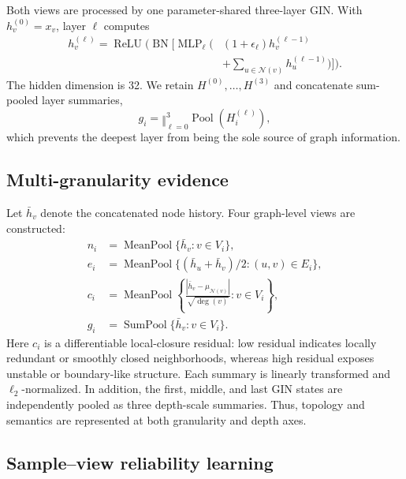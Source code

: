 \documentclass[10pt,twocolumn]{article}
\begin{document}
Both views are processed by one parameter-shared three-layer GIN. With $h_v^{(0)}=x_v$, layer $\ell$ computes
\begin{equation}
\label{eq:gin}
\begin{aligned}
h_v^{(\ell)}=\operatorname{ReLU}\!\Bigg(
\operatorname{BN}\!\Bigg[\operatorname{MLP}_{\ell}\!\Bigg(&
(1+\epsilon_{\ell})h_v^{(\ell-1)}\\[-2pt]
&+\sum_{u\in\mathcal N(v)}h_u^{(\ell-1)}\Bigg)\Bigg]\Bigg).
\end{aligned}
\end{equation}
The hidden dimension is 32. We retain $H^{(0)},\ldots,H^{(3)}$ and concatenate sum-pooled layer summaries,
\begin{equation}
g_i=\mathop{\Vert}_{\ell=0}^{3}\operatorname{Pool}\!\left(H_i^{(\ell)}\right),
\end{equation}
which prevents the deepest layer from being the sole source of graph information.

\subsection{Multi-granularity evidence}

Let $\bar h_v$ denote the concatenated node history. Four graph-level views are constructed:
\begin{align}
n_i &= \operatorname{MeanPool}\{\bar h_v:v\in V_i\},\\
e_i &= \operatorname{MeanPool}\{(\bar h_u+\bar h_v)/2:(u,v)\in E_i\},\\
c_i &= \operatorname{MeanPool}\left\{
\frac{|\bar h_v-\mu_{\mathcal N(v)}|}{\sqrt{\deg(v)}}:v\in V_i\right\},\\
g_i &= \operatorname{SumPool}\{\bar h_v:v\in V_i\}.
\end{align}
Here $c_i$ is a differentiable local-closure residual: low residual indicates locally redundant or smoothly closed neighborhoods, whereas high residual exposes unstable or boundary-like structure. Each summary is linearly transformed and $\ell_2$-normalized. In addition, the first, middle, and last GIN states are independently pooled as three depth-scale summaries. Thus, topology and semantics are represented at both granularity and depth axes.

\subsection{Sample--view reliability learning}
\end{document}

